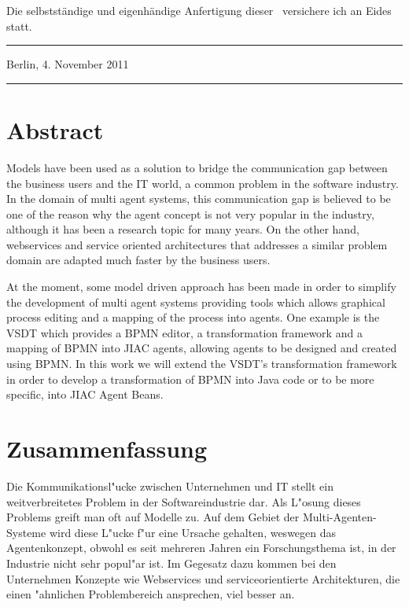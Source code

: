 
Die selbstst\"{a}ndige und eigenh\"{a}ndige Anfertigung dieser \ARTDERARBEIT\
versichere ich an Eides statt.

\vspace{4cm}
\parbox{6cm}{\hrule \strut \centering \small Berlin, 4. November 2011}
\hfill
\parbox{6cm}{\hrule \strut \centering \small \AUTOR}

\newpage



\section*{Abstract}
Models have been used as a solution to bridge the communication gap between the business users and the IT world, a common problem in the software industry. In the domain of multi agent systems, this communication gap is believed to be one of the reason why the agent concept is not very popular in the industry, although it has been a research topic for many years. On the other hand, webservices and service oriented architectures that addresses a similar problem domain are adapted much faster by the business users. 
 
At the moment, some model driven approach has been made in order to simplify the development of multi agent systems providing tools which allows graphical process editing and a mapping of the process into agents. One example is the VSDT which provides a BPMN editor, a transformation framework and a mapping of BPMN into JIAC agents, allowing agents to be designed and created using BPMN. In this work we will extend the VSDT's transformation framework in order to develop a transformation of BPMN into Java code or to be more specific, into JIAC Agent Beans.


\section*{Zusammenfassung}
Die Kommunikationsl"ucke zwischen Unternehmen und IT stellt ein weitverbreitetes Problem in der Softwareindustrie dar. Als L"osung dieses Problems greift man oft auf Modelle zu. Auf dem Gebiet der Multi-Agenten-Systeme wird diese L"ucke f"ur eine Ursache gehalten, weswegen das Agentenkonzept, obwohl es seit mehreren Jahren ein Forschungsthema ist, in der Industrie nicht sehr popul"ar ist. Im Gegesatz dazu kommen bei den Unternehmen Konzepte wie Webservices und serviceorientierte Architekturen, die einen "ahnlichen Problembereich ansprechen, viel besser an.

